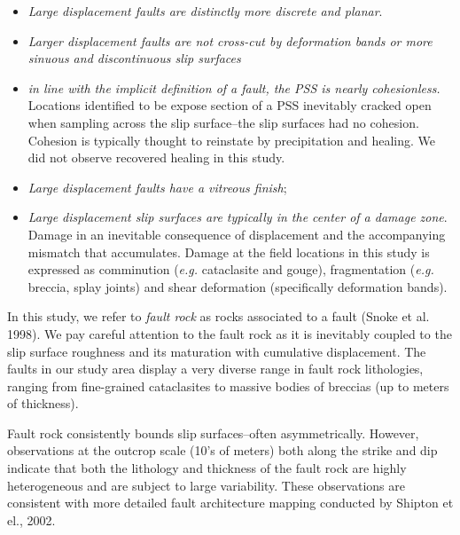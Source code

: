 \documentclass[12pt,a4paper]{article}
\begin{document}
\begin{itemize}
	
	\item \textit{Large displacement faults are distinctly more discrete and planar}.
	
	\item \textit{Larger displacement faults are not cross-cut by deformation bands or more sinuous and discontinuous slip surfaces}
	
	\item \textit{in line with the implicit definition of a fault, the PSS is nearly cohesionless.} Locations identified to be expose section of a PSS inevitably cracked open when sampling across the slip surface--the slip surfaces had no cohesion. Cohesion is typically thought to reinstate by precipitation and healing. We did not observe recovered healing in this study.
	
	\item \textit{Large displacement faults have a vitreous finish};
	
	\item \textit{Large displacement slip surfaces are typically in the center of a damage zone}. Damage in an inevitable consequence of displacement and the accompanying mismatch that accumulates. Damage at the field locations in this study is expressed as comminution (\textit{e.g.} cataclasite and gouge), fragmentation (\textit{e.g.} breccia, splay joints) and shear deformation (specifically deformation bands).
	
\end{itemize}

 


In this study, we refer to \textit{fault rock} as rocks  associated to a fault (Snoke et al. 1998). We pay careful attention to the fault rock as it is inevitably coupled to the slip surface roughness and its maturation with cumulative displacement. The faults in our study area display a very diverse range in fault rock lithologies, ranging from fine-grained cataclasites to massive  bodies of breccias (up to meters of thickness). 

Fault rock consistently bounds slip surfaces--often asymmetrically. However, observations at the outcrop scale (10’s of meters) both along the strike and dip indicate that both the lithology and thickness of the fault rock are highly heterogeneous and are subject to large variability. These observations are consistent with more detailed fault architecture mapping conducted by Shipton et el., 2002.  
\end{document}
